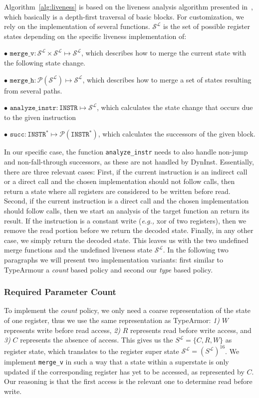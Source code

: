 Algorithm~\ref{alg:liveness} is based on the liveness analysis algorithm presented in~\cite{khedker2009data}, which basically is a depth-first traversal of basic blocks. 
For customization, we rely on the implementation of several functions. $\mathcal{S}^\mathcal{L}$ is the set of possible register states depending on the specific liveness implementation of:

$\bullet$ $\texttt{merge\_v} : \mathcal{S}^\mathcal{L} \times \mathcal{S}^\mathcal{L} \mapsto \mathcal{S}^\mathcal{L}$, which describes how to merge the current state with the following state change.

$\bullet$ $\texttt{merge\_h} : \mathcal{P}(\mathcal{S}^\mathcal{L}) \mapsto \mathcal{S}^\mathcal{L}$, which describes how to merge a set of states resulting from several paths.

$\bullet$ $\texttt{analyze\_instr} : \texttt{INSTR} \mapsto \mathcal{S}^\mathcal{L}$, which calculates the state change that occurs due to the given instruction 

$\bullet$ $\texttt{succ} : \texttt{INSTR}^* \mapsto \mathcal{P}(\texttt{INSTR}^*)$, which calculates the successors of the given block.

In our specific case, the function \texttt{analyze\_instr} needs to also handle non-jump and non-fall-through successors, as these are not handled by DynInst. 
Essentially, there are three relevant cases: First, if the current instruction is an indirect call or a direct call and the chosen implementation should not follow calls, 
then return a state where all registers are considered to be written before read. Second, if the current instruction is a direct call and the chosen implementation should follow calls, 
then we start an analysis of the target function an return its result.
If the instruction is a constant write (\textit{e.g.,} xor of two registers), 
then we remove the read portion before we return the decoded state.
Finally, in any other case, we simply return the decoded state.
This leaves us with the two undefined merge functions and the undefined liveness state $\mathcal{S}^\mathcal{L}$. In the following two paragraphs we will present two 
implementation variants: first similar to TypeArmour a \emph{count} based policy and second our \emph{type} based policy.

\subsubsection{Required Parameter Count} 
To implement the \emph{count} policy, we only need a coarse representation of the state of one register, thus we use the same representation as TypeArmor: 
\textit{1)} $W$ represents write before read access, 
\textit{2)} $R$ represents read before write access, and 
\textit{3)} $C$ represents the absence of access. 
This gives us the $S^\mathcal{L} = \{ C, R, W \}$ as register state, which translates to the register super state $\mathcal{S}^\mathcal{L} = (S^\mathcal{L})^{16}$. 
We implement \texttt{merge\_v} in such a way that a state within a superstate is only updated if the corresponding register has yet to be accessed, as represented
by $C$. Our reasoning is that the first access is the relevant one to determine read before write.

